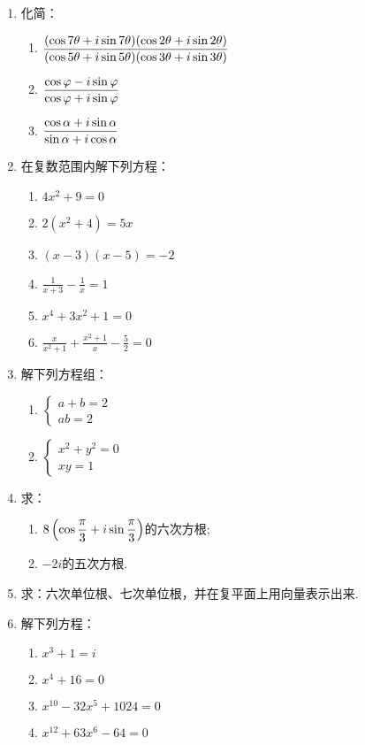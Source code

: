 \begin{enumerate}
\item 化简：
\begin{enumerate}[(1)]
    \item $\dfrac{(\cos{7\theta}+i\sin{7\theta})(\cos{2\theta}+i\sin{2\theta})}{(\cos{5\theta}+i\sin{5\theta})(\cos{3\theta}+i\sin{3\theta})}$
    \item $\dfrac{\cos\varphi-i\sin\varphi}{\cos{\varphi}+i\sin{\varphi}}$
    \item $\dfrac{\cos{\alpha}+i\sin{\alpha}}{\sin\alpha+i\cos\alpha}$
\end{enumerate}
\item 在复数范围内解下列方程：
\begin{multicols}{2}
\begin{enumerate}[(1)]
    \item $4x^2+9=0$
    \item $2(x^2+4)=5x$
    \item $(x-3)(x-5)=-2$
    \item $\frac{1}{x+3}-\frac{1}{x}=1$
    \item $x^4+3x^2+1=0$
    \item $\frac{x}{x^2+1}+\frac{x^2+1}{x}-\frac{5}{2}=0$
\end{enumerate}
\end{multicols}
\item 解下列方程组：
\begin{multicols}{2}
\begin{enumerate}[(1)]
    \item $\begin{cases}
a+b=2\\ab=2        
    \end{cases}$
    \item $\begin{cases}
        x^2+y^2=0\\
        xy=1
    \end{cases}$
\end{enumerate}
\end{multicols}

\item 求：
\begin{enumerate}[(1)]
    \item $8\left(\cos{\dfrac{\pi}{3}}+i\sin{\dfrac{\pi}{3}}\right)$的六次方根;
    \item $-2i$的五次方根.
\end{enumerate}
\item 求：六次单位根、七次单位根，并在复平面上用向量表示出来.

\item 解下列方程：
\begin{multicols}{2}
\begin{enumerate}[(1)]
    \item $x^3+1=i$
    \item $x^4+16=0$
    \item $x^{10}-32x^5+1024=0$
    \item $x^{12}+63x^6-64=0$
\end{enumerate}
\end{multicols}


\end{enumerate}
